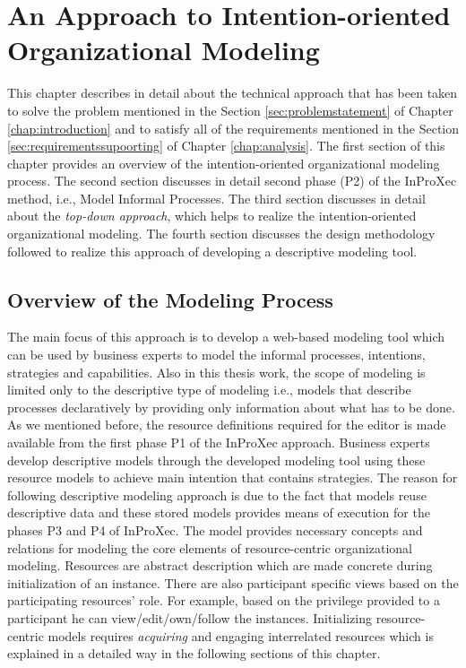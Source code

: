 \chapter{An Approach to Intention-oriented Organizational Modeling}
\label{chap:approach}
This chapter describes in detail about the technical approach that has been taken to solve the problem mentioned in the Section \ref{sec:problemstatement} of Chapter \ref{chap:introduction} and to satisfy all of the requirements mentioned in the Section \ref{sec:requirementssupoorting} of Chapter \ref{chap:analysis}. The first section of this chapter provides an overview of the intention-oriented organizational modeling process. The second section discusses in detail second phase (P2) of the InProXec method, i.e., Model Informal Processes. The third section discusses in detail about the \textit{top-down approach}, which helps to realize the intention-oriented organizational modeling. The fourth section discusses the design methodology followed to realize this approach of developing a descriptive modeling tool. 

\section{Overview of the Modeling Process}
\label{sec:overviewmodelingprocess}
The main focus of this approach is to develop a web-based modeling tool which can be used by business experts to model the informal processes, intentions, strategies and capabilities. Also in this thesis work, the scope of modeling is limited only to the descriptive type of modeling i.e., models that describe processes declaratively by providing only information about what has to be done. As we mentioned before, the resource definitions required for the editor is made available from the first phase P1 of the InProXec approach. Business experts develop descriptive models through the developed modeling tool using these resource models to achieve main intention that contains strategies. The reason for following descriptive modeling approach is due to the fact that models reuse descriptive data and these stored models provides means of execution for the phases P3 and P4 of InProXec. The model provides necessary concepts and relations for modeling the core elements of resource-centric organizational modeling. Resources are abstract description which are made concrete during initialization of an instance. There are also participant specific views based on the participating resources' role. For example, based on the privilege provided to a participant he can view/edit/own/follow the instances. Initializing resource-centric models requires \textit{acquiring} and engaging interrelated resources \cite{Sungur2015} which is explained in a detailed way in the following sections of this chapter. 

